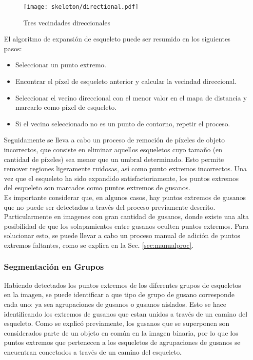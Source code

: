 \begin{figure}[h t b p ! H]
 \centering
   \texttt{[image: skeleton/directional.pdf]}
 \caption{Tres vecindades direccionales}
 \label{fig:directional}
\end{figure}

El algoritmo de expansi\'on de esqueleto puede ser resumido en 
los siguientes pasos:

\begin{itemize}
\item Seleccionar un punto extremo.
\item Encontrar el p\'ixel de esqueleto anterior y calcular la
  vecindad direccional.
\item Seleccionar el vecino direccional con el menor valor en el
  mapa de distancia y marcarlo como p\'ixel de esqueleto.
\item Si el vecino seleccionado no es un punto de contorno, repetir
  el proceso.
\end{itemize}

Seguidamente se lleva a cabo un proceso de remoci\'on de p\'ixeles de objeto 
incorrectos, que consiste en eliminar aquellos esqueletos cuyo tama\~no (en 
cantidad de p\'ixeles) sea menor que un umbral determinado. Esto permite remover
regiones ligeramente ruidosas, as\'i como punto extremos incorrectos.
Una vez que el esqueleto ha sido expandido satisfactoriamente, los puntos
extremos del esqueleto son marcados como puntos extremos de gusanos.\\

Es importante considerar que, en algunos casos, hay puntos extremos de gusanos
que no puede ser detectados a trav\'es del proceso previamente descrito. 
Particularmente en imagenes con gran cantidad de gusanos, donde existe
una alta posibilidad de que los solapamientos entre gusanos oculten
puntos extremos. Para solucionar esto, se puede llevar a cabo un proceso
manual de adici\'on de puntos extremos faltantes, como se explica en 
la Sec. \ref{sec:manualproc}.


\subsubsection*{Segmentaci\'on en Grupos}


Habiendo detectados los puntos extremos de los diferentes grupos de esqueletos
en la imagen, se puede identificar a que tipo de grupo de gusano corresponde cada uno:
ya sea agrupaciones de gusanos o gusanos aislados. Esto se hace identificando
los extremos de gusanos que estan unidos a trav\'es de un camino del esqueleto.
Como se explic\'o previamente, los gusanos que se superponen son considerados 
parte de un objeto en com\'un en la imagen binaria, por lo que los puntos
extremos que pertenecen a los esqueletos de agrupaciones de gusanos se encuentran
conectados a trav\'es de un camino del esqueleto.\\

